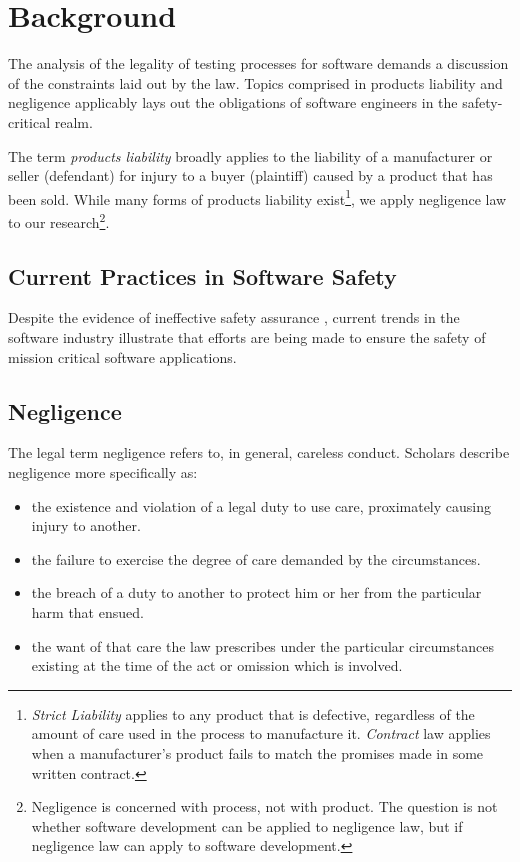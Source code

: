 \chapter{Background}
The analysis of the legality of testing processes for software demands a
discussion of the constraints laid out by the law. Topics comprised in products
liability and negligence applicably lays out the obligations of software
engineers in the safety-critical realm.

The term \textit{products liability} broadly applies to the liability of a
manufacturer or seller (defendant) for injury to a buyer (plaintiff) caused by
a product that has been sold. While many forms of products liability
exist\footnote{\textit{Strict Liability} applies to any product that is
defective, regardless of the amount of care used in the process to manufacture
it. \textit{Contract} law applies when a manufacturer's product fails to match
the promises made in some written contract.}, we apply negligence law to our
research\footnote{Negligence is concerned with process, not with product. The
question is not whether software development can be applied to negligence law,
but if negligence law can apply to software development.}.

\section{Current Practices in Software Safety}
Despite the evidence of ineffective safety assurance \cite{Leveson93,Maisel05},
current trends in the software industry illustrate that efforts are being made
to ensure the safety of mission critical software applications.

\section{Negligence}
The legal term negligence refers to, in general, careless conduct. Scholars
describe negligence more specifically as:

\singlespace
\begin{itemize}
 \item the existence and violation of a legal duty to use care, proximately 
 causing injury to another.
 \item the failure to exercise the degree of care demanded by the circumstances.
 \item the breach of a duty to another to protect him or her from the particular
 harm that ensued.
 \item the want of that care the law prescribes under the particular
 circumstances existing at the time of the act or omission which is involved.
\end{itemize}
\doublespace

